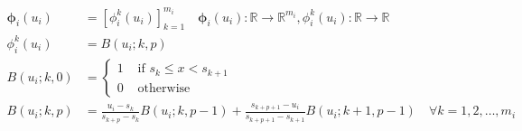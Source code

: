 \documentclass[11pt]{article}
\begin{document}
    \begin{equation}
        \label{eq:b-splines-basis-ftt}
        \begin{aligned}
            \bm{\phi}_i(u_i) &= [\phi_i^k(u_i)]_{k=1}^{m_i} \quad \bm{\phi}_i(u_i) : \mathbb{R} \rightarrow
                \mathbb{R}^{m_i},\phi_i^k(u_i) : \mathbb{R} \rightarrow \mathbb{R}\\
            \phi_i^k(u_i) &= B(u_i;k,p)\\
            B(u_i;k,0)&=
            \begin
            {cases}
                1 & \text { if } s_k \leq x<s_{k+1} \\ 0 & \text { otherwise }
            \end{cases} \\
            B(u_i;k,p)&=\frac{u_i-s_k}{s_{k+p}-s_k} B(u_i;k,p-1)+\frac{s_{k+p+1}-u_i}{s_{k+p+1}-s_{k+1}} B(u_i;k+1, p-1) \quad \forall k=1,2,\dots,m_i
        \end{aligned}
    \end{equation}
\end{document}
